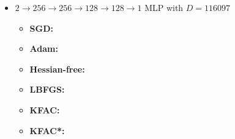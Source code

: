 \begin{itemize}
\item $2 \to 256 \to 256\to 128 \to 128 \to 1$ MLP with $D=\num{116097}$
  \begin{itemize}
    \def\pathToRuns{../kfac_pinns_exp/exp20_poisson2d_mlp_tanh_256/tex}
  \item \textbf{SGD:} 
  \item \textbf{Adam:} 
  \item \textbf{Hessian-free:} 
  \item \textbf{LBFGS:} 
  \item \textbf{KFAC:} 
  \item \textbf{KFAC*:} 
  \end{itemize}
\end{itemize}

